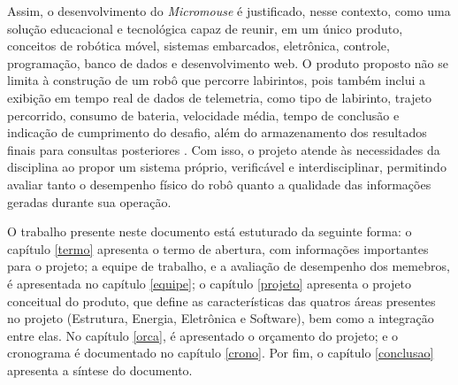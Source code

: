 Assim, o desenvolvimento do \textit{Micromouse} é justificado, nesse contexto, como uma solução educacional e tecnológica capaz de reunir, em um único produto, conceitos de robótica móvel, sistemas embarcados, eletrônica, controle, programação, banco de dados e desenvolvimento web. O produto proposto não se limita à construção de um robô que percorre labirintos, pois também inclui a exibição em tempo real de dados de telemetria, como tipo de labirinto, trajeto percorrido, consumo de bateria, velocidade média, tempo de conclusão e indicação de cumprimento do desafio, além do armazenamento dos resultados finais para consultas posteriores \cite{garcia2026tema}. Com isso, o projeto atende às necessidades da disciplina ao propor um sistema próprio, verificável e interdisciplinar, permitindo avaliar tanto o desempenho físico do robô quanto a qualidade das informações geradas durante sua operação.

O trabalho presente neste documento está estuturado da seguinte forma: o capítulo \ref{termo} apresenta o termo de abertura, com informações importantes para o projeto; a equipe de trabalho, e a avaliação de desempenho dos memebros, é apresentada no capítulo \ref{equipe}; o capítulo \ref{projeto} apresenta o projeto conceitual do produto, que define as características das quatros áreas presentes no projeto (Estrutura, Energia, Eletrônica e Software), bem como a integração entre elas. No capítulo \ref{orca}, é apresentado o orçamento do projeto; e o cronograma é documentado no capítulo \ref{crono}. Por fim, o capítulo \ref{conclusao} apresenta a síntese do documento.